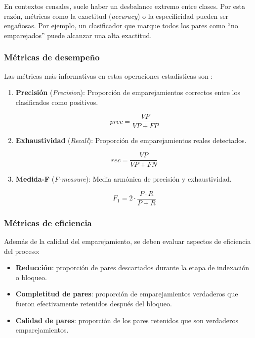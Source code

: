 \documentclass[
  12pt,
]{book}
\providecommand{\tightlist}{%
  \setlength{\itemsep}{0pt}\setlength{\parskip}{0pt}}
\begin{document}
En contextos censales, suele haber un desbalance extremo entre clases. Por esta razón, métricas como la exactitud (\emph{accuracy}) o la especificidad pueden ser engañosas. Por ejemplo, un clasificador que marque todos los pares como ``no emparejados'' puede alcanzar una alta exactitud.

\subsubsection{Métricas de desempeño}\label{muxe9tricas-de-desempeuxf1o}

Las métricas más informativas en estas operaciones estadísticas son \citep{christen2012data, nauman2022introduction}:

\begin{enumerate}
\def\labelenumi{\arabic{enumi}.}
\item
  \textbf{Precisión} (\emph{Precision}): Proporción de emparejamientos correctos entre los clasificados como positivos.

  \[prec = \frac{VP}{VP + FP}\]
\item
  \textbf{Exhaustividad} (\emph{Recall}): Proporción de emparejamientos reales detectados.

  \[rec = \frac{VP}{VP + FN}\]
\item
  \textbf{Medida-F} (\emph{F-measure}): Media armónica de precisión y exhaustividad.

  \[F_1 = 2 \cdot \frac{P \cdot R}{P + R}\]
\end{enumerate}

\subsubsection{Métricas de eficiencia}\label{muxe9tricas-de-eficiencia}

Además de la calidad del emparejamiento, se deben evaluar aspectos de eficiencia del proceso:

\begin{itemize}
\tightlist
\item
  \textbf{Reducción}: proporción de pares descartados durante la etapa de indexación o bloqueo.
\item
  \textbf{Completitud de pares}: proporción de emparejamientos verdaderos que fueron efectivamente retenidos después del bloqueo.
\item
  \textbf{Calidad de pares}: proporción de los pares retenidos que son verdaderos emparejamientos.
\end{itemize}
\end{document}
